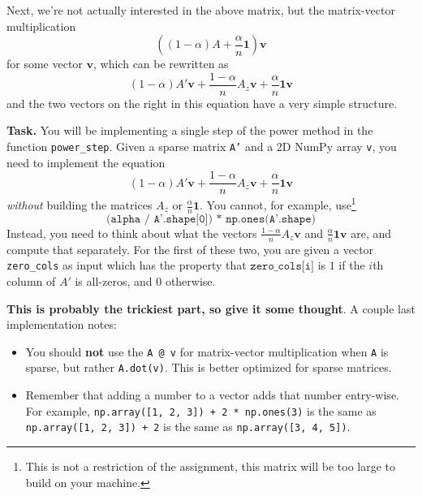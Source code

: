 \documentclass{article}
\theoremstyle{remark}
\newcommand{\vv}[1]{\mathbf{#1}}
\begin{document}
Next, we're not actually interested in the above matrix, but the matrix-vector multiplication
\begin{displaymath}
  ((1 - \alpha)A + \frac{\alpha}{n}\vv 1)\vv v
\end{displaymath}
for some vector $\vv v$, which can be rewritten as
\begin{displaymath}
  (1 - \alpha)A'\vv v + \frac{1 - \alpha}{n}A_z\vv v +  \frac{\alpha}{n}\vv 1 \vv v
\end{displaymath}
and the two vectors on the right in this equation have a very simple structure.

\smallskip
\noindent
\textbf{Task.}
You will be implementing a single step of the power method in the function \texttt{power\_step}.
Given a sparse matrix \texttt{A'} and a 2D NumPy array \texttt{v}, you need to implement the
equation
\begin{displaymath}
  (1 - \alpha)A'\vv v + \frac{1 - \alpha}{n} A_z\vv v +  \frac{\alpha}{n}\vv 1 \vv v
\end{displaymath}
\textit{without} building the matrices $A_z$ or $\frac {\alpha}{n}\vv 1$.
You cannot, for example, use\footnote{This is not a restriction of the assignment, this matrix will be too large to build on your machine.}
\begin{displaymath}
  \texttt{(alpha / A'.shape[0]) * np.ones(A'.shape)}
\end{displaymath}
Instead, you need to think about what the vectors $\frac{1 - \alpha}{n}A_z\vv v$ and $\frac{\alpha}{n}\vv 1 \vv v$ are, and compute that separately.
For the first of these two, you are given a vector \texttt{zero\_cols} as input which has the property that $\texttt{zero\_cols[i]}$ is $1$ if the $i$th column of $A'$ is all-zeros, and $0$ otherwise.

\textbf{This is probably the trickiest part, so give it some thought}. A couple last implementation notes:
\begin{itemize}
\item
  You should \textbf{not} use the \texttt{A @ v} for matrix-vector multiplication when \texttt{A} is sparse, but rather \texttt{A.dot(v)}.
  This is better optimized for sparse matrices.
\item
  Remember that adding a number to a vector adds that number entry-wise.
  For example, \texttt{np.array([1, 2, 3]) + 2 * np.ones(3)} is the same as \texttt{np.array([1, 2, 3]) + 2} is the same as \texttt{np.array([3, 4, 5])}.
\end{itemize}
\end{document}
